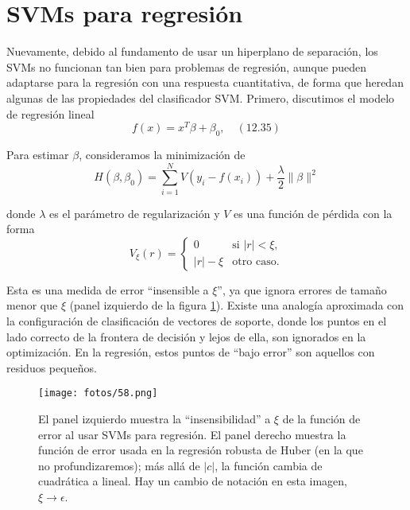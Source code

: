 \section{SVMs para regresión}

Nuevamente, debido al fundamento de usar un hiperplano de separación, los SVMs no funcionan tan bien para problemas de regresión, aunque pueden adaptarse para la regresión con una respuesta cuantitativa, de forma que heredan algunas de las propiedades del clasificador SVM. Primero, discutimos el modelo de regresión lineal
\begin{equation}
f(x) = x^T \beta + \beta_0, \quad (12.35)
\end{equation}

\noindent Para estimar $\beta$, consideramos la minimización de
\begin{equation}
H(\beta, \beta_0) = \sum_{i=1}^{N} V(y_i - f(x_i)) + \frac{\lambda}{2} \| \beta \|^2
\label{eq:12.36}
\end{equation}

\noindent donde $\lambda$ es el parámetro de regularización y $V$ es una función de pérdida con la forma
\begin{equation}
V_\xi(r) =
\begin{cases}
0 & \text{si } |r| < \xi, \\
|r| - \xi & \text{otro caso}.
\end{cases}
\end{equation}

Esta es una medida de error ``insensible a $\xi$'', ya que ignora errores de tamaño menor que $\xi$ (panel izquierdo de la figura \ref{fig:12.8}). Existe una analogía aproximada con la configuración de clasificación de vectores de soporte, donde los puntos en el lado correcto de la frontera de decisión y lejos de ella, son ignorados en la optimización. En la regresión, estos puntos de ``bajo error'' son aquellos con residuos pequeños. \\

\begin{figure}[h]
\centering
\texttt{[image: fotos/58.png]}
\caption{El panel izquierdo muestra la ``insensibilidad'' a $\xi$ de la función de error al usar SVMs para regresión. El panel derecho muestra la función de error usada en la regresión robusta de Huber (en la que no profundizaremos); más allá de $|c|$, la función cambia de cuadrática a lineal. Hay un cambio de notación en esta imagen, $\xi \to \epsilon$.}
\label{fig:12.8}
\end{figure}


